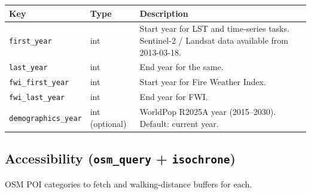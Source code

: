 \documentclass[
  letterpaper,
  DIV=11,
  numbers=noendperiod]{scrreprt}
\newcounter{none} %
\begin{document}
{\def\LTcaptype{none} %
\begin{longtable}[]{@{}
  >{\raggedright\arraybackslash}p{}
  >{\raggedright\arraybackslash}p{}
  >{\raggedright\arraybackslash}p{}@{}}
\toprule\noalign{}
\begin{minipage}[b]{\linewidth}\raggedright
Key
\end{minipage} & \begin{minipage}[b]{\linewidth}\raggedright
Type
\end{minipage} & \begin{minipage}[b]{\linewidth}\raggedright
Description
\end{minipage} \\
\midrule\noalign{}
\endhead
\bottomrule\noalign{}
\endlastfoot
\texttt{first\_year} & int & Start year for LST and time-series tasks.
Sentinel-2 / Landsat data available from 2013-03-18. \\
\texttt{last\_year} & int & End year for the same. \\
\texttt{fwi\_first\_year} & int & Start year for Fire Weather Index. \\
\texttt{fwi\_last\_year} & int & End year for FWI. \\
\texttt{demographics\_year} & int (optional) & WorldPop R2025A year
(2015--2030). Default: current year. \\
\end{longtable}
}

\subsection{\texorpdfstring{Accessibility (\texttt{osm\_query} +
\texttt{isochrone})}{Accessibility (osm\_query + isochrone)}}\label{accessibility-osm_query-isochrone}

OSM POI categories to fetch and walking-distance buffers for each.
\end{document}
